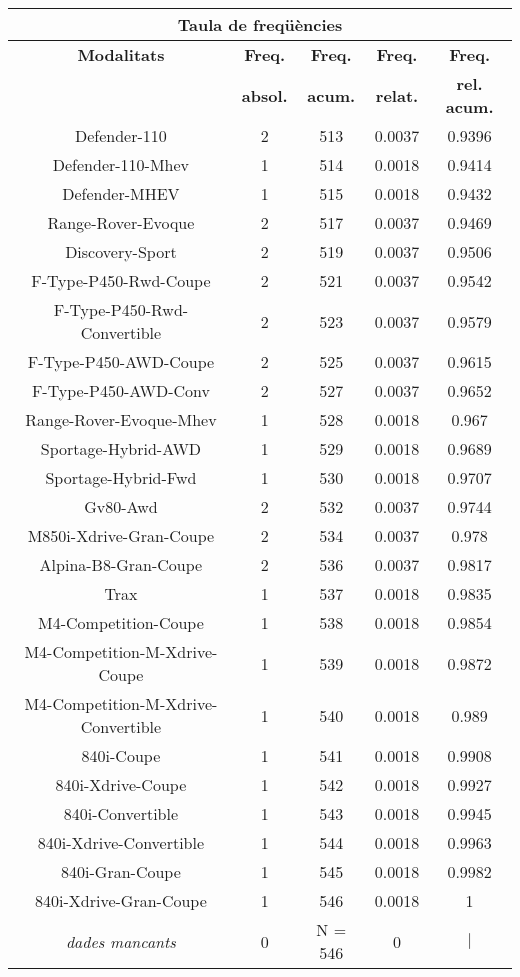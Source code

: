 \begin{center}
\begin{tabular}{|c|c|c|c|@{}c@{}|}
\hline
\multicolumn{5}{|c|}{\bf Taula de freq\" u\`encies} \\ 
\hline
{\bf Modalitats} & {\bf Freq.} & {\bf Freq.} & {\bf Freq.} & {\bf Freq.} \\ 
 & {\bf absol.} & {\bf acum.} & {\bf relat.} & {\bf rel. acum.} \\ 
\hline
\hline
Defender-110 & 2 & 513 & 0.0037 & 0.9396 \\ 
Defender-110-Mhev & 1 & 514 & 0.0018 & 0.9414 \\ 
Defender-MHEV & 1 & 515 & 0.0018 & 0.9432 \\ 
Range-Rover-Evoque & 2 & 517 & 0.0037 & 0.9469 \\ 
Discovery-Sport & 2 & 519 & 0.0037 & 0.9506 \\ 
F-Type-P450-Rwd-Coupe & 2 & 521 & 0.0037 & 0.9542 \\ 
F-Type-P450-Rwd-Convertible & 2 & 523 & 0.0037 & 0.9579 \\ 
F-Type-P450-AWD-Coupe & 2 & 525 & 0.0037 & 0.9615 \\ 
F-Type-P450-AWD-Conv & 2 & 527 & 0.0037 & 0.9652 \\ 
Range-Rover-Evoque-Mhev & 1 & 528 & 0.0018 & 0.967 \\ 
Sportage-Hybrid-AWD & 1 & 529 & 0.0018 & 0.9689 \\ 
Sportage-Hybrid-Fwd & 1 & 530 & 0.0018 & 0.9707 \\ 
Gv80-Awd & 2 & 532 & 0.0037 & 0.9744 \\ 
M850i-Xdrive-Gran-Coupe & 2 & 534 & 0.0037 & 0.978 \\ 
Alpina-B8-Gran-Coupe & 2 & 536 & 0.0037 & 0.9817 \\ 
Trax & 1 & 537 & 0.0018 & 0.9835 \\ 
M4-Competition-Coupe & 1 & 538 & 0.0018 & 0.9854 \\ 
M4-Competition-M-Xdrive-Coupe & 1 & 539 & 0.0018 & 0.9872 \\ 
M4-Competition-M-Xdrive-Convertible & 1 & 540 & 0.0018 & 0.989 \\ 
840i-Coupe & 1 & 541 & 0.0018 & 0.9908 \\ 
840i-Xdrive-Coupe & 1 & 542 & 0.0018 & 0.9927 \\ 
840i-Convertible & 1 & 543 & 0.0018 & 0.9945 \\ 
840i-Xdrive-Convertible & 1 & 544 & 0.0018 & 0.9963 \\ 
840i-Gran-Coupe & 1 & 545 & 0.0018 & 0.9982 \\ 
840i-Xdrive-Gran-Coupe & 1 & 546 & 0.0018 & 1 \\ 
\hline
\hline
\it dades mancants & 0 & N = 546 & 0 & \colorbox{gris}{\color{gris}$|$ \hspace{11ex}} \\ 
\hline
\end{tabular}
\end{center} \vfill

